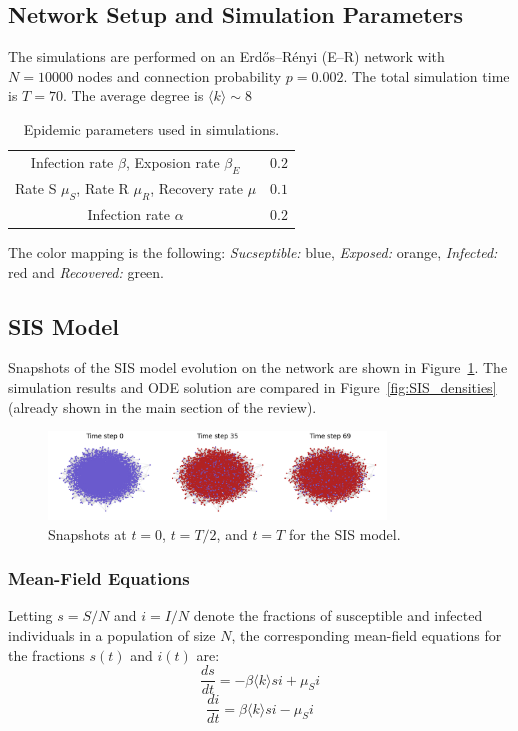 \subsection{Network Setup and Simulation Parameters}

The simulations are performed on an Erdős–Rényi (E–R) network with $N=10000$ nodes and connection probability $p=0.002$. The total simulation time is $T=70$. The average degree  is $\langle k \rangle \sim 8$

\begin{table}[H]
    \centering
    \begin{tabular}{cc}
        Infection rate $\beta$, Exposion rate $\beta_E$  & $0.2$ \\
        Rate S $\mu_S$, Rate R $\mu_R$, Recovery rate $\mu$ & $0.1$\\
        Infection rate $\alpha$ & $0.2$ \\
    \end{tabular}
    \caption{Epidemic parameters used in simulations.}
    \label{tab:my_params}
\end{table}


The color mapping is the following: \textit{Sucseptible:} blue, \textit{Exposed:} orange, \textit{Infected:} red and \textit{Recovered:} green.


\subsection{SIS Model}

Snapshots of the SIS model evolution on the network are shown in Figure~\ref{fig:sis_snapshots}. The simulation results and ODE solution are compared in Figure~\ref{fig:SIS_densities} (already shown in the main section of the review).

\begin{figure}[H]
\centering
\includegraphics[width=0.8\textwidth]{images/Homogeneous/SIS_snapshots.png}
\caption{Snapshots at $t=0$, $t=T/2$, and $t=T$ for the SIS model.}
\label{fig:sis_snapshots}
\end{figure}

\subsubsection{Mean-Field Equations}
\label{app:full_counts}
Letting $s=S/N$ and $i=I/N$ denote the fractions of susceptible and infected individuals in a population of size $N$, the corresponding mean-field equations for the fractions $s(t)$ and $i(t)$ are:
$$\dfrac{ds}{dt}=-\beta \langle k \rangle si + \mu_S i$$
$$\dfrac{di}{dt}=\beta \langle k \rangle si - \mu_S i$$

